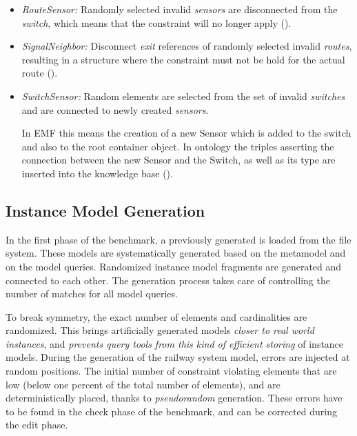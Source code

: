 \begin{itemize}
\begin{itemize}
    \item \emph{RouteSensor:} Randomly selected invalid \emph{sensors} are disconnected from the \emph{switch}, which means that the constraint will no longer apply ().
    
    \item  \emph{SignalNeighbor:} Disconnect \emph{exit} references of randomly selected invalid \emph{routes}, resulting in a structure where the constraint must not be hold for the actual route ().
        
    \item \emph{SwitchSensor:} Random elements are selected from the set of invalid \emph{switches} and are connected to newly created \emph{sensors}.
    
    In EMF this means the creation of a new Sensor which is added to the switch and also to the root container object. In ontology the triples asserting the connection between the new Sensor and the Switch, as well as its type are inserted into the knowledge base ().
    
  \end{itemize}
\end{itemize}
 


\subsection{Instance Model Generation}
\label{sec:instanceGeneration}

In the first phase of the benchmark, a previously generated  is loaded from the file system. These models are systematically generated based on the metamodel and on the model queries. Randomized instance model fragments are generated and connected to each other. The generation process takes care of controlling the number of matches for all model queries.

To break symmetry, the exact number of elements and cardinalities are randomized. This brings artificially generated models \emph{closer to real world instances}, and \emph{prevents query tools from this kind of efficient storing} of instance models. During the generation of the railway system model, errors are injected at random positions. The initial number of constraint violating elements that are low (below one percent of the total number of elements), and are deterministically placed, thanks to \emph{pseudorandom} generation. These errors have to be found in the check phase of the benchmark, and can be corrected during the edit phase.

